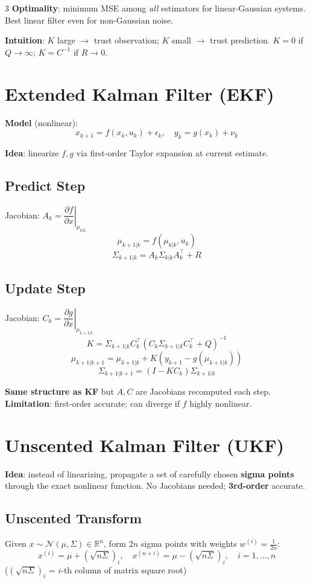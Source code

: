 \documentclass[9pt,landscape]{article}
\begin{document}
\begin{multicols}{3}
\textbf{Optimality}: minimum MSE among \emph{all} estimators for linear-Gaussian systems. Best linear filter even for non-Gaussian noise.

\textbf{Intuition}: $K$ large $\to$ trust observation; $K$ small $\to$ trust prediction. $K=0$ if $Q\to\infty$; $K=C^{-1}$ if $R\to0$.

\section{Extended Kalman Filter (EKF)}

\textbf{Model} (nonlinear):
\[x_{k+1}=f(x_k,u_k)+\epsilon_k,\quad y_k=g(x_k)+\nu_k\]

\textbf{Idea}: linearize $f,g$ via first-order Taylor expansion at current estimate.

\subsection{Predict Step}
Jacobian: $A_k=\left.\dfrac{\partial f}{\partial x}\right|_{\mu_{k|k}}$
\[\mu_{k+1|k}=f(\mu_{k|k},u_k)\]
\[\Sigma_{k+1|k}=A_k\Sigma_{k|k}A_k^\top+R\]

\subsection{Update Step}
Jacobian: $C_k=\left.\dfrac{\partial g}{\partial x}\right|_{\mu_{k+1|k}}$
\[K=\Sigma_{k+1|k}C_k^\top(C_k\Sigma_{k+1|k}C_k^\top+Q)^{-1}\]
\[\mu_{k+1|k+1}=\mu_{k+1|k}+K(y_{k+1}-g(\mu_{k+1|k}))\]
\[\Sigma_{k+1|k+1}=(I-KC_k)\Sigma_{k+1|k}\]

\textbf{Same structure as KF} but $A,C$ are Jacobians recomputed each step.\\
\textbf{Limitation}: first-order accurate; can diverge if $f$ highly nonlinear.

\section{Unscented Kalman Filter (UKF)}

\textbf{Idea}: instead of linearizing, propagate a set of carefully chosen \textbf{sigma points} through the exact nonlinear function. No Jacobians needed; \textbf{3rd-order} accurate.

\subsection{Unscented Transform}
Given $x\sim\mathcal{N}(\mu,\Sigma)\in\mathbb{R}^n$, form $2n$ sigma points with weights $w^{(i)}=\frac{1}{2n}$:
\[x^{(i)}=\mu+\left(\sqrt{n\Sigma}\right)_i,\quad x^{(n+i)}=\mu-\left(\sqrt{n\Sigma}\right)_i,\quad i=1,\ldots,n\]
($(\sqrt{n\Sigma})_i$ = $i$-th column of matrix square root)


\end{multicols}
\end{document}
